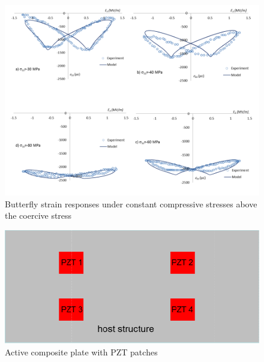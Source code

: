 \begin{figure} 
\centering 
\includegraphics[width=5.0in]{./chap_2_pol_sw/figures/fig_7_butterfly_strain_responses_under_constant_compressive_stresses_above_the_coercive_stress.png} 
\caption{Butterfly strain responses under constant compressive stresses above the coercive stress}
\label{fig_7_butterfly_strain_responses_under_constant_compressive_stresses_above_the_coercive_stress}
\end{figure}

\begin{figure}
\centering
\includegraphics[width=5.0in]{./chap_2_pol_sw/figures/activecompositeplatewithpatches.pdf}
\caption{Active composite plate with PZT patches}
\label{fig:ActiveComposBeam} 
\end{figure}


